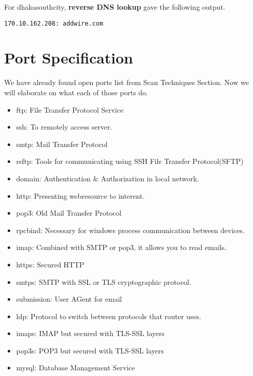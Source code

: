 \documentclass[11pt]{article}
\begin{document}
For dhakasouthcity, \textbf{\textbf{\textbf{reverse DNS lookup}}} gave the following output.\\
\begin{verbatim}
170.10.162.208: addwire.com
\end{verbatim}
\section{Port Specification}
\label{sec:org5c1a68b}
We have already found open ports list from Scan Techniques Section. Now we will elaborate on what each of those ports do.\\
\begin{itemize}
\item ftp: File Transfer Protocol Service\\
\item ssh: To remotely access server.\\
\item smtp: Mail Transfer Protocol\\
\item rsftp: Tools for communicating using SSH File Transfer Protocol(SFTP)\\
\item domain: Authentication \& Authorization in local network.\\
\item http: Presenting webresource to interent.\\
\item pop3: Old Mail Transfer Protocol\\
\item rpcbind: Necessary for windows process communication between devices.\\
\item imap: Combined with SMTP or pop3, it allows you to read emails.\\
\item https: Secured HTTP\\
\item smtps: SMTP with SSL or TLS cryptographic protocol.\\
\item submission: User AGent for email\\
\item ldp: Protocol to switch between protocols that router uses.\\
\item imaps: IMAP but secured with TLS-SSL layers\\
\item pop3s: POP3 but secured with TLS-SSL layers\\
\item mysql: Database Management Service\\
\end{itemize}
\end{document}
